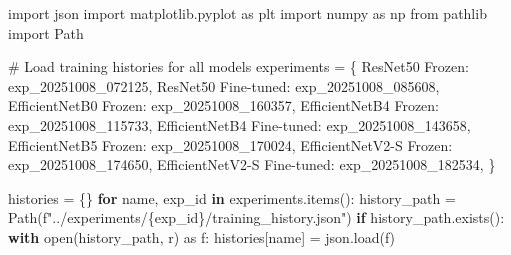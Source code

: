 \documentclass[
  letterpaper,
  DIV=11,
  numbers=noendperiod]{scrartcl}
\newenvironment{Shaded}{\begin{snugshade}}{\end{snugshade}}
\newcommand{\BuiltInTok}[1]{\textcolor[rgb]{0.00,0.23,0.31}{#1}}
\newcommand{\CommentTok}[1]{\textcolor[rgb]{0.37,0.37,0.37}{#1}}
\newcommand{\ControlFlowTok}[1]{\textcolor[rgb]{0.00,0.23,0.31}{\textbf{#1}}}
\newcommand{\ImportTok}[1]{\textcolor[rgb]{0.00,0.46,0.62}{#1}}
\newcommand{\KeywordTok}[1]{\textcolor[rgb]{0.00,0.23,0.31}{\textbf{#1}}}
\newcommand{\NormalTok}[1]{\textcolor[rgb]{0.00,0.23,0.31}{#1}}
\newcommand{\OperatorTok}[1]{\textcolor[rgb]{0.37,0.37,0.37}{#1}}
\newcommand{\SpecialCharTok}[1]{\textcolor[rgb]{0.37,0.37,0.37}{#1}}
\newcommand{\SpecialStringTok}[1]{\textcolor[rgb]{0.13,0.47,0.30}{#1}}
\newcommand{\StringTok}[1]{\textcolor[rgb]{0.13,0.47,0.30}{#1}}
\renewenvironment{Shaded}{%
  \begin{tcolorbox}[%
    enhanced,%
    colback=codebg,%
    colframe=codebg,%
    borderline west={3pt}{0pt}{sectionblue},%
    boxrule=0pt,%
    arc=0pt,%
    boxsep=5pt,%
    left=2mm,%
    right=2mm,%
    top=2mm,%
    bottom=2mm%
  ]%
}{%
  \end{tcolorbox}%
}
\begin{document}
\begin{Shaded}
\begin{Highlighting}[]
\ImportTok{import}\NormalTok{ json}
\ImportTok{import}\NormalTok{ matplotlib.pyplot }\ImportTok{as}\NormalTok{ plt}
\ImportTok{import}\NormalTok{ numpy }\ImportTok{as}\NormalTok{ np}
\ImportTok{from}\NormalTok{ pathlib }\ImportTok{import}\NormalTok{ Path}

\CommentTok{\# Load training histories for all models}
\NormalTok{experiments }\OperatorTok{=}\NormalTok{ \{}
    \StringTok{\textquotesingle{}ResNet50 Frozen\textquotesingle{}}\NormalTok{: }\StringTok{\textquotesingle{}exp\_20251008\_072125\textquotesingle{}}\NormalTok{,}
    \StringTok{\textquotesingle{}ResNet50 Fine{-}tuned\textquotesingle{}}\NormalTok{: }\StringTok{\textquotesingle{}exp\_20251008\_085608\textquotesingle{}}\NormalTok{,}
    \StringTok{\textquotesingle{}EfficientNetB0 Frozen\textquotesingle{}}\NormalTok{: }\StringTok{\textquotesingle{}exp\_20251008\_160357\textquotesingle{}}\NormalTok{,}
    \StringTok{\textquotesingle{}EfficientNetB4 Frozen\textquotesingle{}}\NormalTok{: }\StringTok{\textquotesingle{}exp\_20251008\_115733\textquotesingle{}}\NormalTok{,}
    \StringTok{\textquotesingle{}EfficientNetB4 Fine{-}tuned\textquotesingle{}}\NormalTok{: }\StringTok{\textquotesingle{}exp\_20251008\_143658\textquotesingle{}}\NormalTok{,}
    \StringTok{\textquotesingle{}EfficientNetB5 Frozen\textquotesingle{}}\NormalTok{: }\StringTok{\textquotesingle{}exp\_20251008\_170024\textquotesingle{}}\NormalTok{,}
    \StringTok{\textquotesingle{}EfficientNetV2{-}S Frozen\textquotesingle{}}\NormalTok{: }\StringTok{\textquotesingle{}exp\_20251008\_174650\textquotesingle{}}\NormalTok{,}
    \StringTok{\textquotesingle{}EfficientNetV2{-}S Fine{-}tuned\textquotesingle{}}\NormalTok{: }\StringTok{\textquotesingle{}exp\_20251008\_182534\textquotesingle{}}\NormalTok{,}
\NormalTok{\}}

\NormalTok{histories }\OperatorTok{=}\NormalTok{ \{\}}
\ControlFlowTok{for}\NormalTok{ name, exp\_id }\KeywordTok{in}\NormalTok{ experiments.items():}
\NormalTok{    history\_path }\OperatorTok{=}\NormalTok{ Path(}\SpecialStringTok{f"../experiments/}\SpecialCharTok{\{}\NormalTok{exp\_id}\SpecialCharTok{\}}\SpecialStringTok{/training\_history.json"}\NormalTok{)}
    \ControlFlowTok{if}\NormalTok{ history\_path.exists():}
        \ControlFlowTok{with} \BuiltInTok{open}\NormalTok{(history\_path, }\StringTok{\textquotesingle{}r\textquotesingle{}}\NormalTok{) }\ImportTok{as}\NormalTok{ f:}
\NormalTok{            histories[name] }\OperatorTok{=}\NormalTok{ json.load(f)}
\end{Highlighting}
\end{Shaded}
\end{document}
